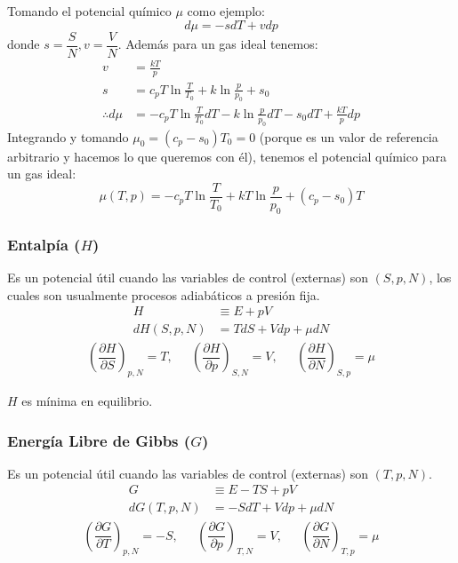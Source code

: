 \documentclass[]{article}
\numberwithin{equation}{section}
\newcommand{\dderiv}[3]{\left(\dfrac{\partial #1}{\partial #2} \right)_{#3}}
\newcommand{\0}{\textcolor{gray}{0}}
\begin{document}
Tomando el potencial químico \(\mu\) como ejemplo:
\begin{equation}
	d\mu = -sdT + vdp
\end{equation}
donde \(s=\dfrac{S}{N}, v=\dfrac{V}{N}\). Además para un gas ideal tenemos:
\begin{align*}
	v &= \frac{kT}{p}\\
	s &= c_pT\ln\frac{T}{T_0} + k\ln\frac{p}{p_0} + s_0\\
	\therefore d\mu &= -c_pT\ln\frac{T}{T_0}dT - k\ln\frac{p}{p_0}dT - s_0dT + \frac{kT}{p}dp
\end{align*}
Integrando y tomando \(\mu_0 = (c_p - s_0)T_0 = 0\) (porque es un valor de referencia arbitrario y hacemos lo que queremos con él), tenemos el potencial químico para un gas ideal:
\begin{equation}
	\mu (T,p) = -c_pT\ln\frac{T}{T_0} + kT\ln\frac{p}{p_0} + (c_p-s_0)T
	\label{eqn:mu_gas_ideal}
\end{equation}

\subsubsection{Entalpía (\(H\))}
Es un potencial útil cuando las variables de control (externas) son \((S, p, N)\), los cuales son usualmente procesos adiabáticos a presión fija.
\begin{align}
	H &\equiv E + pV\\
	dH(S,p,N) &= TdS + Vdp + \mu dN
\end{align}
\begin{equation}
	\begin{matrix}
		\dderiv{H}{S}{p,N} = T,\ \ \ & \dderiv{H}{p}{S,N} = V,\ \ \ & \dderiv{H}{N}{S,p} = \mu
	\end{matrix}
\end{equation}

\(H\) es mínima en equilibrio.

\subsubsection{Energía Libre de Gibbs (\(G\))}
Es un potencial útil cuando las variables de control (externas) son \((T, p, N)\).
\begin{align}
	G &\equiv E - TS + pV \label{Gibbs}\\
	dG(T,p,N) &= -SdT + Vdp + \mu dN
\end{align}
\begin{equation}
	\begin{matrix}
		\dderiv{G}{T}{p,N} = -S,\ \ \ & \dderiv{G}{p}{T,N} = V,\ \ \ & \dderiv{G}{N}{T,p} = \mu
	\end{matrix}
\end{equation}
\end{document}
